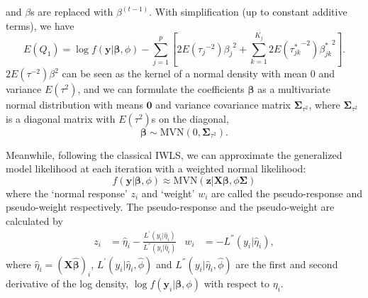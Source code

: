 \documentclass[AMA,STIX1COL,]{WileyNJD-v2}
\begin{document}
and \(\beta\)s are replaced with \(\beta^{(t-1)}\). With simplification
(up to constant additive terms), we have
\begin{equation}\label{eq:EQ1_IWLS}
E(Q_1) = \log f(\textbf{y}|\boldsymbol{\beta}, \phi) - \sum\limits_{j=1}^p\left[ {2E({\tau_j}^{-2})}{\beta_j}^2 +\sum\limits_{k=1}^{K_j} {2E({\tau_{jk}^*}^{-2})}{\beta_{jk}^*}^2\right].
\end{equation} \(2E({\tau}^{-2})\beta^2\) can be seen as the kernel of a
normal density with mean 0 and variance \(E(\tau^{2})\), and we can
formulate the coefficients \(\boldsymbol{\beta}\) as a multivariate
normal distribution with means \(\boldsymbol{0}\) and variance
covariance matrix \(\boldsymbol{\Sigma}_{\tau^2}\), where
\(\boldsymbol{\Sigma}_{\tau^2}\) is a diagonal matrix with
\(E(\tau^2)\)s on the diagonal, \[
\boldsymbol{\beta }\sim \text{MVN}(0, \boldsymbol{\Sigma}_{\tau^2}).
\]

Meanwhile, following the classical IWLS, we can approximate the
generalized model likelihood at each iteration with a weighted normal
likelihood: \[
f(\textbf{y}|\boldsymbol{\beta}, \phi) \approx \text{MVN}(\textbf{z}|\boldsymbol{X} \boldsymbol{\beta}, \phi\boldsymbol{\Sigma })
\] where the `normal response' \(z_i\) and `weight' \(w_i\) are called
the pseudo-response and pseudo-weight respectively. The pseudo-response
and the pseudo-weight are calculated by \[
\begin{aligned}
z_i &= \hat\eta_i - \frac{L^{'}(y_i|\hat\eta_i)}{L^{''}(y_i|\hat\eta_i)}& w_i &= - L^{''}(y_i|\hat\eta_i),
\end{aligned}
\] where \(\hat\eta_i = (\boldsymbol{X} {\hat{\boldsymbol{\beta}}})_i\),
\(L^{'}(y_i|\hat\eta_i, \hat \phi)\) and
\(L^{''}(y_i|\hat\eta_i, \hat \phi)\) are the first and second
derivative of the log density,
\(\log f(\textbf{y}_i|\boldsymbol{\beta}, \phi)\) with respect to
\(\eta_i\).
\end{document}
